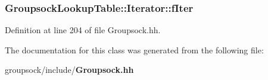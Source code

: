 \subsubsection[{f\+Iter}]{ Groupsock\+Lookup\+Table\+::\+Iterator\+::f\+Iter\hspace{0.3cm}{\ttfamily [private]}}\label{classGroupsockLookupTable_1_1Iterator_a8d29e938eb9a668e2701d40b1ee82cbb}


Definition at line 204 of file Groupsock.\+hh.



The documentation for this class was generated from the following file\+:\begin{DoxyCompactItemize}
\item 
groupsock/include/{\bf Groupsock.\+hh}\end{DoxyCompactItemize}
